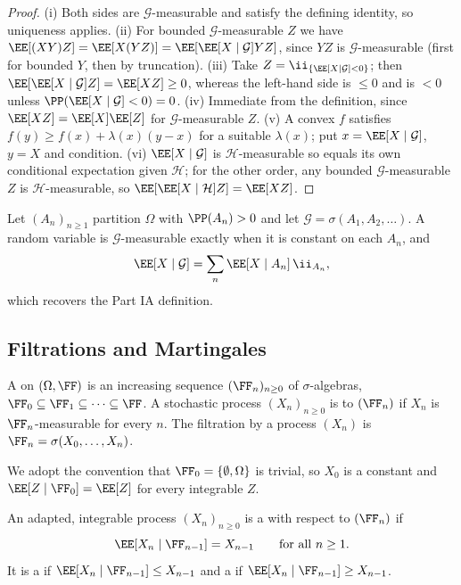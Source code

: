 \begin{proof}
	(i) Both sides are $\mathcal{G}$-measurable and satisfy the defining identity, so uniqueness applies. (ii) For bounded $\mathcal{G}$-measurable $Z$ we have $\EE[(XY)Z] = \EE[X(YZ)] = \EE[\EE[X\mid\mathcal{G}]YZ]$, since $YZ$ is $\mathcal{G}$-measurable (first for bounded $Y$, then by truncation).
	(iii) Take $Z = \ii_{\{\EE[X\mid\mathcal{G}]<0\}}$; then $\EE[\EE[X\mid\mathcal{G}]Z] = \EE[XZ]\geq 0$, whereas the left-hand side is $\leq 0$ and is $<0$ unless $\PP(\EE[X\mid\mathcal{G}]<0) = 0$.
	(iv) Immediate from the definition, since $\EE[XZ] = \EE[X]\EE[Z]$ for $\mathcal{G}$-measurable $Z$.
	(v) A convex $f$ satisfies $f(y)\geq f(x) + \lambda(x)(y-x)$ for a suitable $\lambda(x)$; put $x = \EE[X\mid\mathcal{G}]$, $y = X$ and condition.
	(vi) $\EE[X\mid\mathcal{G}]$ is $\mathcal{H}$-measurable so equals its own conditional expectation given $\mathcal{H}$; for the other order, any bounded $\mathcal{G}$-measurable $Z$ is $\mathcal{H}$-measurable, so $\EE[\EE[X\mid\mathcal{H}]Z] = \EE[XZ]$.
\end{proof}

\begin{example}
	Let $(A_n)_{n\geq1}$ partition $\Omega$ with $\PP(A_n) > 0$ and let $\mathcal{G} = \sigma(A_1,A_2,\dots)$. A random variable is $\mathcal{G}$-measurable exactly when it is constant on each $A_n$, and
	$$
	\EE[X\mid\mathcal{G}] = \sum_n \EE[X\mid A_n]\,\ii_{A_n},
	$$
	which recovers the Part IA definition.
\end{example}

\subsection{Filtrations and Martingales}

\begin{definition}[Filtration]
	A  on $(\Omega,\FF)$ is an increasing sequence $(\FF_n)_{n\geq 0}$ of $\sigma$-algebras, $\FF_0 \subseteq \FF_1 \subseteq \cdots \subseteq \FF$. A stochastic process $(X_n)_{n\geq0}$ is  to $(\FF_n)$ if $X_n$ is $\FF_n$-measurable for every $n$. The filtration  by a process $(X_n)$ is $\FF_n = \sigma(X_0,\dots,X_n)$.
\end{definition}

We adopt the convention that $\FF_0 = \{\emptyset,\Omega\}$ is trivial, so $X_0$ is a constant and $\EE[Z\mid\FF_0] = \EE[Z]$ for every integrable $Z$.

\begin{definition}[Martingale]
	An adapted, integrable process $(X_n)_{n\geq0}$ is a  with respect to $(\FF_n)$ if
	$$
	\EE[X_n \mid \FF_{n-1}] = X_{n-1} \qquad \text{for all } n \geq 1.
	$$
	It is a  if $\EE[X_n\mid\FF_{n-1}] \leq X_{n-1}$ and a  if $\EE[X_n\mid\FF_{n-1}]\geq X_{n-1}$.
\end{definition}

